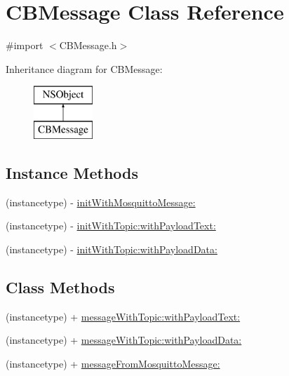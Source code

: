 \hypertarget{interface_c_b_message}{\section{C\+B\+Message Class Reference}
\label{interface_c_b_message}
}


{\ttfamily \#import $<$C\+B\+Message.\+h$>$}

Inheritance diagram for C\+B\+Message\+:\begin{figure}[H]
\begin{center}
\leavevmode
\includegraphics[height=2.000000cm]{interface_c_b_message}
\end{center}
\end{figure}
\subsection*{Instance Methods}
\begin{DoxyCompactItemize}
\item 
(instancetype) -\/ \hyperlink{interface_c_b_message_a38d3e9a65419e27551d38a7628995fb7}{init\+With\+Mosquitto\+Message\+:}
\item 
(instancetype) -\/ \hyperlink{interface_c_b_message_a044bf150504f584117fc5d50f025a26f}{init\+With\+Topic\+:with\+Payload\+Text\+:}
\item 
(instancetype) -\/ \hyperlink{interface_c_b_message_a95a5d53b35af87d89f8fc0c316f0499a}{init\+With\+Topic\+:with\+Payload\+Data\+:}
\end{DoxyCompactItemize}
\subsection*{Class Methods}
\begin{DoxyCompactItemize}
\item 
(instancetype) + \hyperlink{interface_c_b_message_abba382b3f82cd7aebb2f3104ed543602}{message\+With\+Topic\+:with\+Payload\+Text\+:}
\item 
(instancetype) + \hyperlink{interface_c_b_message_a01d6ea86886dec9962ee090d0e76608d}{message\+With\+Topic\+:with\+Payload\+Data\+:}
\item 
(instancetype) + \hyperlink{interface_c_b_message_a3413a6c31ec75df51d2934f5ec58f0db}{message\+From\+Mosquitto\+Message\+:}
\end{DoxyCompactItemize}
